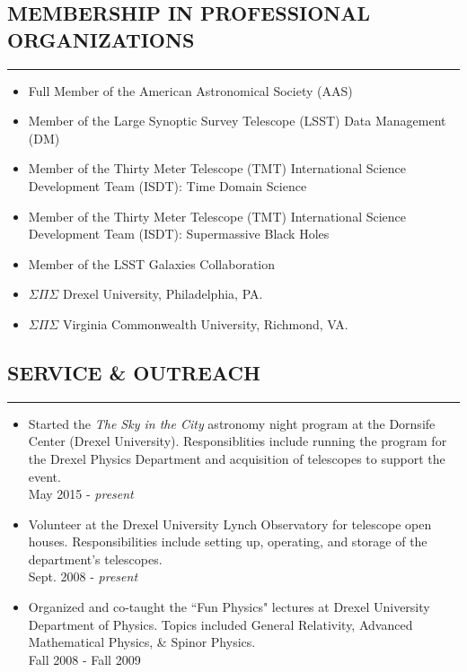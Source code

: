 \documentclass[10pt,a4]{article}
\newcounter{mySaveCounter}
\newcommand\myEnumReset{\setcounter{mySaveCounter}{0}}
\begin{document}
\subsection*{MEMBERSHIP IN PROFESSIONAL ORGANIZATIONS}
\hrule  height 4pt
\vspace{0.2cm}
\begin{itemize}
	\item Full Member of the American Astronomical Society (AAS)
	\item Member of the Large Synoptic Survey Telescope (LSST) Data Management (DM)
	\item Member of the Thirty Meter Telescope (TMT) International Science Development Team (ISDT): Time Domain Science
	\item Member of the Thirty Meter Telescope (TMT) International Science Development Team (ISDT): Supermassive Black Holes
    \item Member of the LSST Galaxies Collaboration
	\item $\Sigma \Pi \Sigma$ Drexel University, Philadelphia, PA.
	\item $\Sigma \Pi \Sigma$ Virginia Commonwealth University, Richmond, VA.
\end{itemize}
\myEnumReset

\subsection*{SERVICE \& OUTREACH}
\hrule  height 4pt
\vspace{0.2cm}
\begin{itemize}
	\item Started the \textit{The Sky in the City} astronomy night program
	at the Dornsife Center (Drexel University). Responsiblities include
	running the program for the Drexel Physics Department and acquisition
	of telescopes to support the event. \\
	May 2015 - {\it present}
	\item Volunteer at the Drexel University Lynch Observatory for
          telescope open houses. Responsibilities include setting up,
          operating, and storage of the department's telescopes. \\
          Sept. 2008 - {\it present}
	\item Organized and co-taught the ``Fun Physics" lectures at
	Drexel University Department of Physics. Topics included General
	Relativity, Advanced Mathematical Physics, \& Spinor Physics. \\
	Fall 2008 - Fall 2009
\end{itemize}
\myEnumReset
\end{document}
